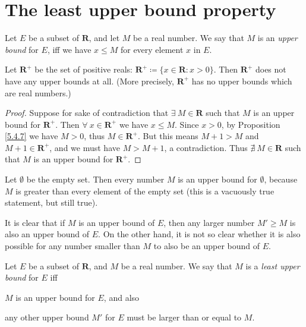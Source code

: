 \section{The least upper bound property}\label{sec 5.5}

\begin{definition}\label{5.5.1}
    Let \(E\) be a subset of \(\mathbf{R}\), and let \(M\) be a real number.
    We say that \(M\) is an \emph{upper bound} for \(E\), iff we have \(x \leq M\) for every element \(x\) in \(E\).
\end{definition}

\setcounter{theorem}{2}
\begin{example}\label{5.5.3}
    Let \(\mathbf{R}^+\) be the set of positive reals: \(\mathbf{R}^+ \coloneqq \{x \in \mathbf{R} : x > 0\}\).
    Then \(\mathbf{R}^+\) does not have any upper bounds at all.
    (More precisely, \(\mathbf{R}^+\) has no upper bounds which are real numbers.)
\end{example}

\begin{proof}
    Suppose for sake of contradiction that \(\exists\ M \in \mathbf{R}\) such that \(M\) is an upper bound for \(\mathbf{R}^+\).
    Then \(\forall\ x \in \mathbf{R}^+\) we have \(x \leq M\).
    Since \(x > 0\), by Proposition \ref{5.4.7} we have \(M > 0\), thus \(M \in \mathbf{R}^+\).
    But this means \(M + 1 > M\) and \(M + 1 \in \mathbf{R}^+\), and we must have \(M > M + 1\), a contradiction.
    Thus \(\nexists\ M \in \mathbf{R}\) such that \(M\) is an upper bound for \(\mathbf{R}^+\).
\end{proof}

\begin{example}\label{5.5.4}
    Let \(\emptyset\) be the empty set.
    Then every number \(M\) is an upper bound for \(\emptyset\), because \(M\) is greater than every element of the empty set
    (this is a vacuously true statement, but still true).
\end{example}

\begin{note}
    It is clear that if \(M\) is an upper bound of \(E\), then any larger number \(M' \geq M\) is also an upper bound of \(E\).
    On the other hand, it is not so clear whether it is also possible for any number smaller than \(M\) to also be an upper bound of \(E\).
\end{note}

\begin{definition}\label{5.5.5}
    Let \(E\) be a subset of \(\mathbf{R}\), and \(M\) be a real number.
    We say that \(M\) is a \emph{least upper bound} for \(E\) iff
    \begin{enumerate*}
        \item \(M\) is an upper bound for \(E\), and also
        \item any other upper bound \(M'\) for \(E\) must be larger than or equal to \(M\).
    \end{enumerate*}
\end{definition}


